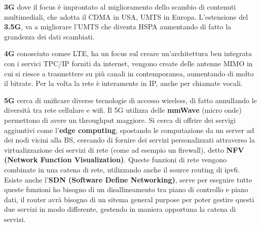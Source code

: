 \documentclass[12pt]{article}
\begin{document}
\textbf{3G} dove il focus \`e improntato al miglioramento dello scambio di contenuti multimediali, che adotta il CDMA in USA, UMTS in Europa. L'estensione del \textbf{3.5G}, va a migliorare l'UMTS che diventa HSPA aumentando di fatto la grandezza dei dati scambiati.

\textbf{4G} conosciuto comee LTE, ha un focus sul creare un'architettura ben integrata con i servici TPC/IP forniti da internet, vengono create delle antenne MIMO in cui si riesce a trasmettere su pi\`u canali in contemporanea, aumentando di molto il bitrate. Per la volta la rete \`e interamente in IP, anche per chiamate vocali.

\textbf{5G} cerca di unificare diverse tecnologie di accesso wireless, di fatto annullando le diversit\`a tra rete cellulare e wifi. Il 5G utilizza delle \textbf{mmWave} (micro onde) permettono di avere un throughput maggiore. Si cerca di offrire dei servigi aggiuntivi come l'\textbf{edge computing}, spostando le computazione da un server ad dei nodi vicini alla BS, cercando di fornire dei servizi personalizzati attraverso la virtualizzazione dei servizi di rete (come ad esempio un firewall), detto \textbf{NFV (Network Function Visualization)}. Queste funzioni di rete vengono combinate in una catena di rete, utilizzando anche il source routing di ipv6. Esiste anche l'\textbf{SDN (Software Define Networking)}, serve per eseguire tutte queste funzioni ho bisogno di un disallineamento tra piano di controllo e piano dati, il router avr\`a bisogno di un sitema general purpose per poter gestire questi due servizi in modo differente, gestendo in maniera opportuna la catena di servizi.
\end{document}
